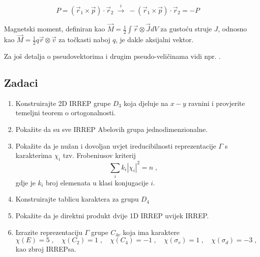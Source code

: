 \[
P = (\vec{r}_1 \times \vec{p}) \cdot \vec{r}_2  \; \stackrel{i}{\longrightarrow} \;
  - (\vec{r}_1 \times \vec{p}) \cdot \vec{r}_2 = - P
\]

Magnetski moment, definiran kao $\vec{M} = \frac{1}{2} \int \vec{r}
\otimes \vec{J} dV$ za gustoću struje $J$, odnosno kao
$\vec{M} = \frac{1}{2} q \vec{r} \otimes \vec{v}$ za točkasti
naboj $q$, je dakle aksijalni vektor.

Za još detalja o pseudovektorima i drugim pseudo-veličinama vidi
npr. \cite{Arfken:1995}.

\subsection*{Zadaci}

\begin{enumerate}[label=\arabic{chapter}.\arabic*.]

\item Konstruirajte 2D IRREP grupe $D_3$ koja djeluje na $x-y$ ravnini
i provjerite temeljni teorem o ortogonalnosti.

\item Pokažite da su sve IRREP Abelovih grupa jednodimenzionalne.

\item Pokažite da je nužan i dovoljan uvjet ireducibilnosti reprezentacije
 $\Gamma$ s karakterima $\chi_i$ tzv. Frobeniusov kriterij
\begin{displaymath}
    \sum_i k_i |\chi_i|^2 = n  \;,
\end{displaymath}
gdje je $k_i$ broj elemenata u klasi konjugacije $i$.

\item Konstruirajte tablicu karaktera za grupu $D_4$

\item Pokažite da je direktni produkt dvije 1D IRREP uvijek IRREP.

\item Izrazite reprezentaciju $\Gamma$ grupe $C_{4v}$ koja ima
karaktere
\begin{displaymath}
  \chi(E)=5\;,\quad \chi(C_2)=1\;,\quad \chi(C_4)=-1\;,\quad
  \chi(\sigma_v)=1\;,\quad \chi(\sigma_d)=-3\;,
\end{displaymath}
kao zbroj IRREPsa.
\end{enumerate}

